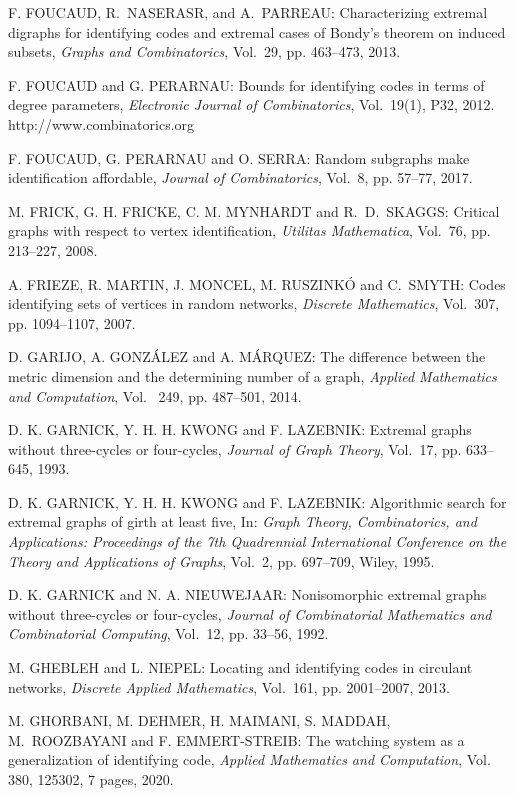 \begin{thebibliography}{999}
F. FOUCAUD, R.~NASERASR, and A.~PARREAU: Characterizing extremal digraphs for identifying codes and extremal cases of Bondy's theorem on induced subsets, {\it Graphs and Combinatorics}, Vol.~29, pp. 463--473, 2013.

F. FOUCAUD and G. PERARNAU: Bounds for identifying codes in terms of degree parameters, {\it Electronic Journal of Combinatorics}, Vol.~19(1), P32, 2012.\\
http://www.combinatorics.org

F. FOUCAUD, G. PERARNAU and O. SERRA: Random subgraphs make identification affordable, {\it Journal of  Combinatorics}, Vol.~8, pp. 57--77, 2017.

M. FRICK, G. H. FRICKE, C. M. MYNHARDT and R.~D.~SKAGGS: Critical graphs with respect to vertex identification, {\it Utilitas Mathematica}, Vol.~76, pp. 213--227, 2008.

A. FRIEZE, R. MARTIN, J. MONCEL, M. RUSZINK\'O and C.~SMYTH: Codes identifying sets of vertices in random networks, {\it Discrete Mathematics}, Vol.~307, pp. 1094--1107, 2007.

D. GARIJO, A. GONZ\'ALEZ and A. M\'ARQUEZ: The difference between the metric dimension and the determining number of a graph, {\it Applied Mathematics and Computation}, Vol.~ 249, pp. 487--501, 2014.

D. K. GARNICK, Y. H. H. KWONG and F. LAZEBNIK: Extremal graphs without three-cycles or four-cycles, {\it Journal of Graph Theory}, Vol.~17, pp. 633--645, 1993.

D. K. GARNICK, Y. H. H. KWONG and F. LAZEBNIK: Algorithmic search for extremal graphs of girth at least five, In: {\it Graph Theory, Combinatorics, and Applications: Proceedings of the 7th Quadrennial International Conference on the Theory and Applications of Graphs}, Vol.~2, pp. 697--709, Wiley, 1995.

D. K. GARNICK and N. A. NIEUWEJAAR: Nonisomorphic extremal graphs without three-cycles or four-cycles, {\it Journal of Combinatorial Mathematics and Combinatorial Computing}, Vol.~12, pp. 33--56, 1992.

M. GHEBLEH and L. NIEPEL: Locating and identifying codes in circulant networks, {\it Discrete Applied Mathematics}, Vol.~161, pp. 2001--2007, 2013.

M. GHORBANI, M. DEHMER, H. MAIMANI, S. MADDAH, M.~ROOZ\-BAYANI and F. EMMERT-STREIB: The watching system as a generalization of identifying code, {\it Applied Mathematics and Computation}, Vol. 380, 125302, 7 pages, 2020.


\end{thebibliography}

